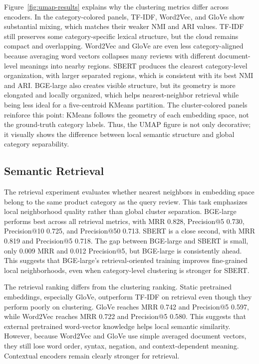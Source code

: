 \documentclass{article}
\begin{document}
Figure~\ref{fig:umap-results} explains why the clustering metrics differ across encoders. In the category-colored panels, TF-IDF, Word2Vec, and GloVe show substantial mixing, which matches their weaker NMI and ARI values. TF-IDF still preserves some category-specific lexical structure, but the cloud remains compact and overlapping. Word2Vec and GloVe are even less category-aligned because averaging word vectors collapses many reviews with different document-level meanings into nearby regions. SBERT produces the clearest category-level organization, with larger separated regions, which is consistent with its best NMI and ARI. BGE-large also creates visible structure, but its geometry is more elongated and locally organized, which helps nearest-neighbor retrieval while being less ideal for a five-centroid KMeans partition. The cluster-colored panels reinforce this point: KMeans follows the geometry of each embedding space, not the ground-truth category labels. Thus, the UMAP figure is not only decorative; it visually shows the difference between local semantic structure and global category separability.

\subsection{Semantic Retrieval}

The retrieval experiment evaluates whether nearest neighbors in embedding space belong to the same product category as the query review. This task emphasizes local neighborhood quality rather than global cluster separation. BGE-large performs best across all retrieval metrics, with MRR 0.828, Precision@5 0.730, Precision@10 0.725, and Precision@50 0.713. SBERT is a close second, with MRR 0.819 and Precision@5 0.718. The gap between BGE-large and SBERT is small, only 0.009 MRR and 0.012 Precision@5, but BGE-large is consistently ahead. This suggests that BGE-large's retrieval-oriented training improves fine-grained local neighborhoods, even when category-level clustering is stronger for SBERT.

The retrieval ranking differs from the clustering ranking. Static pretrained embeddings, especially GloVe, outperform TF-IDF on retrieval even though they perform poorly on clustering. GloVe reaches MRR 0.742 and Precision@5 0.597, while Word2Vec reaches MRR 0.722 and Precision@5 0.580. This suggests that external pretrained word-vector knowledge helps local semantic similarity. However, because Word2Vec and GloVe use simple averaged document vectors, they still lose word order, syntax, negation, and context-dependent meaning. Contextual encoders remain clearly stronger for retrieval.
\end{document}
